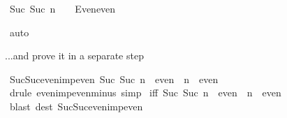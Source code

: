 \begin{isabellebody}
\begin{isamarkuptxt}
\begin{isabelle}
\ Suc\ {\isacharparenleft}Suc\ n{\isacharparenright}\ {\isacharminus}\ {}\ {\isasymin}\ Even{\isachardot}even%
\end{isabelle}%
\end{isamarkuptxt}%
\isamarkuptrue%
\ auto\isanewline
\isamarkupfalse%
\isamarkupfalse%
%
\begin{isamarkuptext}%
...and prove it in a separate step%
\end{isamarkuptext}%
\isamarkuptrue%
\ Suc{\isacharunderscore}Suc{\isacharunderscore}even{\isacharunderscore}imp{\isacharunderscore}even{\isacharcolon}\ {\isachardoublequote}Suc\ {\isacharparenleft}Suc\ n{\isacharparenright}\ {\isasymin}\ even\ {\isasymLongrightarrow}\ n\ {\isasymin}\ even{\isachardoublequote}\isanewline
\isamarkupfalse%
\ {\isacharparenleft}drule\ even{\isacharunderscore}imp{\isacharunderscore}even{\isacharunderscore}minus{\isacharunderscore}{}{\isacharcomma}\ simp{\isacharparenright}\isanewline
\isanewline
\isanewline
\isamarkupfalse%
\ {\isacharbrackleft}iff{\isacharbrackright}{\isacharcolon}\ {\isachardoublequote}{\isacharparenleft}{\isacharparenleft}Suc\ {\isacharparenleft}Suc\ n{\isacharparenright}{\isacharparenright}\ {\isasymin}\ even{\isacharparenright}\ {\isacharequal}\ {\isacharparenleft}n\ {\isasymin}\ even{\isacharparenright}{\isachardoublequote}\isanewline
\isamarkupfalse%
\ {\isacharparenleft}blast\ dest{\isacharcolon}\ Suc{\isacharunderscore}Suc{\isacharunderscore}even{\isacharunderscore}imp{\isacharunderscore}even{\isacharparenright}\isanewline
\isanewline
\isamarkupfalse%
\isanewline
\isanewline
\isamarkupfalse%
\end{isabellebody}%
